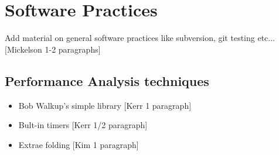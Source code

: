 \section{Software Practices}\label{sec:software}

{\color{red} Add material on general software practices like subversion, git testing etc... [Mickelson 1-2 paragraphs]}
 
 \subsection{Performance Analysis techniques}
 
 {\color{red}
 \begin{itemize}
   \item {Bob Walkup's simple library} [Kerr 1 paragraph]
   \item {Bult-in timers} [Kerr 1/2 paragraph]
   \item {Extrae folding} [Kim 1 paragraph]
 \end{itemize}
}
 




